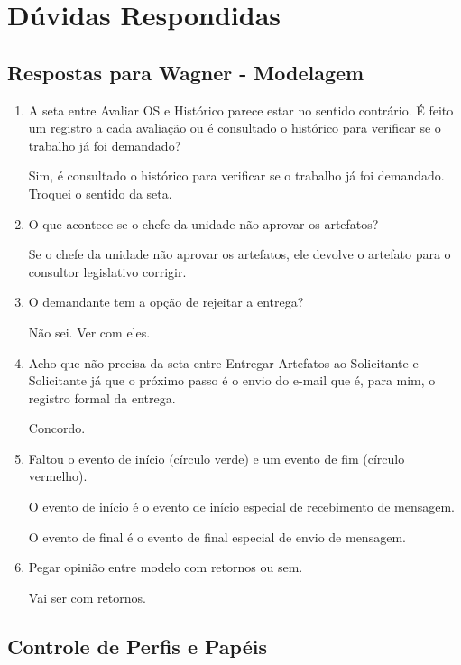 \section{Dúvidas Respondidas}

\subsection{Respostas para Wagner - Modelagem}

\begin{enumerate}
	
	\item A seta entre Avaliar OS e Histórico parece estar no sentido contrário. É feito um registro a cada avaliação ou é consultado o histórico para verificar se o trabalho já foi demandado?
	
	Sim, é consultado o histórico para verificar se o trabalho já foi demandado. Troquei o sentido da seta.
	
	
	\item O que acontece se o chefe da unidade não aprovar os artefatos?
	
	Se o chefe da unidade não aprovar os artefatos, ele devolve o artefato para o consultor legislativo corrigir.
	
	\item O demandante tem a opção de rejeitar a entrega?
	
	Não sei. Ver com eles.
	
	
	\item Acho que não precisa da seta entre Entregar Artefatos ao Solicitante e Solicitante já que o próximo passo é o envio do e-mail que é, para mim, o registro formal da entrega.
	
	Concordo.	
	
	\item Faltou o evento de início (círculo verde) e um evento de fim (círculo vermelho).
	
	O evento de início é o evento de início especial de recebimento de mensagem.
	
	O evento de final é o evento de final especial de envio de mensagem.	
	
	
	\item Pegar opinião entre modelo com retornos ou sem. 
	
	Vai ser com retornos.
\end{enumerate}

\subsection{Controle de Perfis e Papéis}


